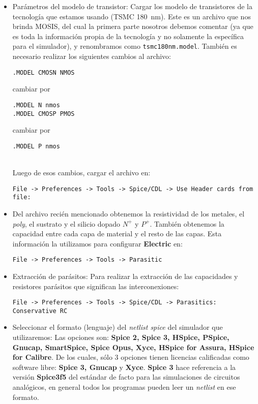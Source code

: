 \begin{itemize}
\item Parámetros del modelo de transistor: Cargar los modelo de transistores de la tecnología que estamos usando (TSMC 180~nm). Este es un archivo que nos brinda MOSIS, del cual la primera parte nosotros debemos comentar (ya que es toda la información propia de la tecnología y no solamente la específica para el simulador), y renombramos como {\footnotesize\verb#tsmc180nm.model#}. También es necesario realizar los siguientes cambios al archivo:\\
\begin{footnotesize}\verb#.MODEL CMOSN NMOS#\end{footnotesize} cambiar por \begin{footnotesize}\verb#.MODEL N nmos# \\
\verb#.MODEL CMOSP PMOS#\end{footnotesize} cambiar por \begin{footnotesize}\verb#.MODEL P nmos# \end{footnotesize} \\
Luego de esos cambios, cargar el archivo en:\\
\begin{footnotesize}\verb.File -> Preferences -> Tools -> Spice/CDL -> Use Header cards from file:.\end{footnotesize}
	\item Del archivo recién mencionado obtenemos la resistividad de los metales, el \emph{poly}, el sustrato y el silicio dopado $N^+$ y $P^+$. También obtenemos la capacidad entre cada capa de material y el resto de las capas. Esta información la utilizamos para configurar \textbf{Electric} en: \\
\begin{footnotesize}\verb.File -> Preferences -> Tools -> Parasitic. \end{footnotesize}
\item Extracción de parásitos: Para realizar la extracción de las capacidades y resistores parásitos que significan las interconexiones: \\
\begin{footnotesize}\verb.File -> Preferences -> Tools -> Spice/CDL -> Parasitics: Conservative RC. \end{footnotesize}
\item Seleccionar el formato (lenguaje) del \emph{netlist spice} del simulador que utilizaremos: Las opciones son: \textbf{Spice 2, Spice 3, HSpice, PSpice, Gnucap, SmartSpice,  Spice Opus, Xyce, HSpice for Assura, HSpice for Calibre}. De los cuales, sólo 3 opciones tienen licencias calificadas como software libre: \textbf{Spice 3, Gnucap} y \textbf{Xyce}. \textbf{Spice 3} hace referencia a la versión \textbf{Spice3f5} del estándar de facto para las simulaciones de circuitos analógicos, en general todos los programas pueden leer un \emph{netlist} en ese formato.
\end{itemize}


